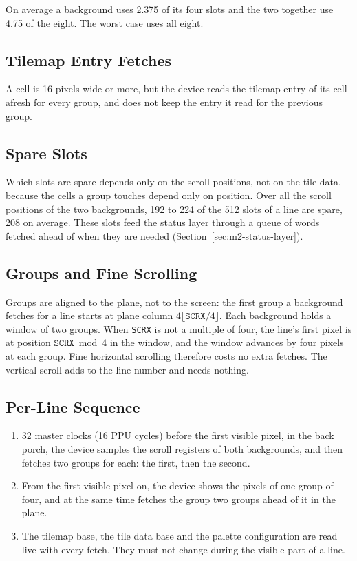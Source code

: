On average a background uses 2.375 of its four slots and the two together use 4.75 of the eight. The worst case uses
all eight.

\subsection{Tilemap Entry Fetches}
\label{sec:m2-entry-cache}

A cell is 16 pixels wide or more, but the device reads the tilemap entry of its cell afresh for every group, and does
not keep the entry it read for the previous group.

\subsection{Spare Slots}
\label{sec:m2-spare-slots}

Which slots are spare depends only on the scroll positions, not on the tile data, because the cells a group touches
depend only on position. Over all the scroll positions of the two backgrounds, 192 to 224 of the 512 slots of a line
are spare, 208 on average. These slots feed the status layer through a queue of words fetched ahead of when they are
needed (Section~\ref{sec:m2-status-layer}).

\subsection{Groups and Fine Scrolling}

Groups are aligned to the plane, not to the screen: the first group a background fetches for a line starts at plane
column $4\lfloor \texttt{SCRX} / 4 \rfloor$. Each background holds a window of two groups. When \texttt{SCRX} is not a
multiple of four, the line's first pixel is at position $\texttt{SCRX} \bmod 4$ in the window, and the window advances
by four pixels at each group. Fine horizontal scrolling therefore costs no extra fetches. The vertical scroll adds to
the line number and needs nothing.

\subsection{Per-Line Sequence}

\begin{enumerate}
	\item 32 master clocks (16 PPU cycles) before the first visible pixel, in the back porch, the device samples the scroll
	      registers of both backgrounds, and then fetches two groups for each: the first, then the second.
	\item From the first visible pixel on, the device shows the pixels of one group of four, and at the same time fetches the
	      group two groups ahead of it in the plane.
	\item The tilemap base, the tile data base and the palette configuration are read live with every fetch. They must not change
	      during the visible part of a line.
\end{enumerate}

